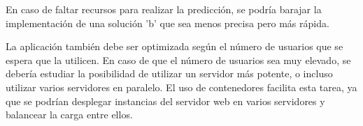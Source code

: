 En caso de faltar recursos para realizar la predicción, se podría barajar la implementación de una solución 'b' que sea menos precisa pero más rápida.

La aplicación también debe ser optimizada según el número de usuarios que se espera que la utilicen.
En caso de que el número de usuarios sea muy elevado, se debería estudiar la posibilidad de utilizar un servidor más potente, o incluso utilizar varios servidores en paralelo.
El uso de contenedores facilita esta tarea, ya que se podrían desplegar instancias del servidor web en varios servidores y balancear la carga entre ellos.





\endinput